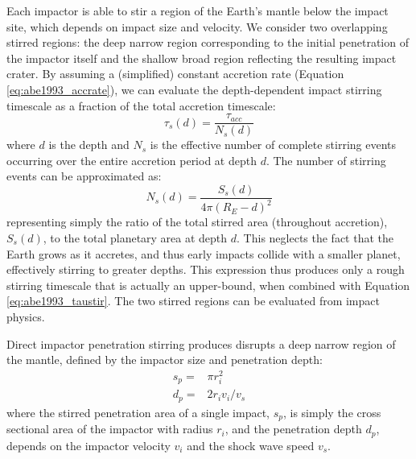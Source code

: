 Each impactor is able to stir a region of the Earth's mantle below the impact site, which depends on impact size and velocity.
We consider two overlapping stirred regions: the deep narrow region corresponding to the initial penetration of the impactor itself and the shallow broad region reflecting the resulting impact crater.
By assuming a (simplified) constant accretion rate (Equation \ref{eq:abe1993_accrate}), we can evaluate the depth-dependent impact stirring timescale as a fraction of the total accretion timescale:
\begin{equation}
  \tau_{s}(d) = \frac{\tau_{acc}}{N_{s}(d)}
  \label{eq:abe1993_taustir}
\end{equation}
where $d$ is the depth and $N_{s}$ is the effective number of complete stirring events occurring over the entire accretion period at depth $d$.
The number of stirring events can be approximated as:
\begin{equation}
  N_{s}(d) = \frac{S_s(d)}{4\pi(R_E - d)^2}
\end{equation}
representing simply the ratio of the total stirred area (throughout accretion), $S_s(d)$, to the total planetary area at depth $d$.
This neglects the fact that the Earth grows as it accretes, and thus early impacts collide with a smaller planet, effectively stirring to greater depths.
This expression thus produces only a rough stirring timescale that is actually an upper-bound, when combined with Equation \ref{eq:abe1993_taustir}.
The two stirred regions can be evaluated from impact physics. 

Direct impactor penetration stirring produces disrupts a deep narrow region of the mantle, defined by the impactor size and penetration depth:
\begin{eqnarray}
  s_p =& \pi r_i^2 \\
  d_p =& 2 r_i v_i/v_s
\end{eqnarray}
where the stirred penetration area of a single impact, $s_p$, is simply the cross sectional area of the impactor with radius $r_i$, and the penetration depth $d_p$, depends on the impactor velocity $v_i$ and the shock wave speed $v_s$.


